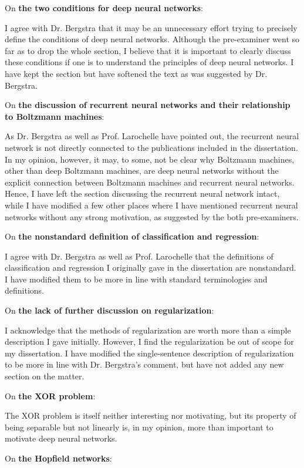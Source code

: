 \documentclass[11pt, oneside]{essay}
\begin{document}
On \textbf{the two conditions for deep neural networks}:

I agree with Dr. Bergstra that it may be an unnecessary
effort trying to precisely define the conditions of deep
neural networks. Although the pre-examiner went so far as to
drop the whole section, I believe that it is important to
clearly discuss these conditions if one is to understand the
principles of deep neural networks. I have kept the section
but have softened the text as was suggested by Dr. Bergstra.

On \textbf{the discussion of recurrent neural networks and
their relationship to Boltzmann machines}:

As Dr. Bergstra as well as Prof. Larochelle have pointed
out, the recurrent neural network is not directly connected
to the publications included in the dissertation. In my
opinion, however, it may, to some, not be clear why
Boltzmann machines, other than deep Boltzmann machines, are
deep neural networks without the explicit connection between
Boltzmann machines and recurrent neural networks. Hence, I
have left the section discussing the recurrent neural
network intact, while I have modified a few other places
where I have mentioned recurrent neural networks without any
strong motivation, as suggested by the both pre-examiners.

On \textbf{the nonstandard definition of classification and
regression}:

I agree with Dr. Bergstra as well as Prof. Larochelle that
the definitions of classification and regression I
originally gave in the dissertation are nonstandard. I have
modified them to be more in line with standard terminologies
and definitions.

On \textbf{the lack of further discussion on
regularization}:

I acknowledge that the methods of regularization are worth
more than a simple description I gave initially. However, I
find the regularization be out of scope for my dissertation.
I have modified the single-sentence description of
regularization to be more in line with Dr. Bergstra's
comment, but have not added any new section on the matter.

On \textbf{the XOR problem}:

The XOR problem is itself neither interesting nor
motivating, but its property of being separable but not
linearly is, in my opinion, more than important to motivate
deep neural networks. 

On \textbf{the Hopfield networks}:
\end{document}

